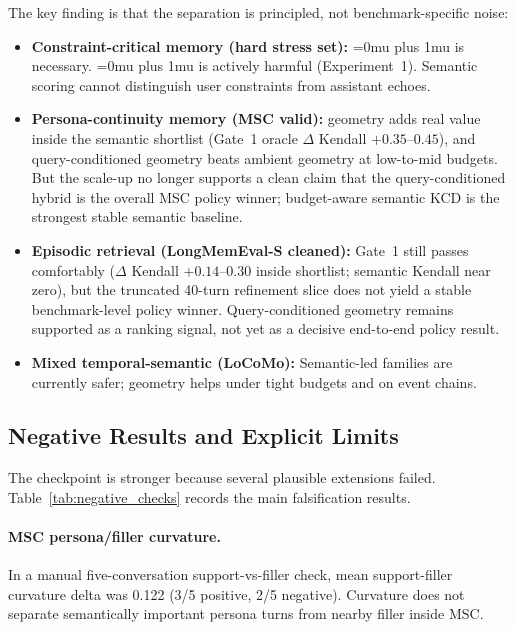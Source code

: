 \documentclass[conference]{IEEEtran}
\newcommand{\pname}[1]{\begingroup\Urlmuskip=0mu plus 1mu\relax\path{#1}\endgroup}
\begin{document}
The key finding is that the separation is principled, not benchmark-specific noise:
\begin{itemize}[leftmargin=1.4em]
    \item \textbf{Constraint-critical memory (hard stress set):} \pname{geometry_KCD} is necessary. \pname{semantic_KCD} is actively harmful (Experiment~1). Semantic scoring cannot distinguish user constraints from assistant echoes.
    \item \textbf{Persona-continuity memory (MSC valid):} geometry adds real value inside the semantic shortlist (Gate~1 oracle $\Delta$ Kendall $+0.35$--$0.45$), and query-conditioned geometry beats ambient geometry at low-to-mid budgets. But the scale-up no longer supports a clean claim that the query-conditioned hybrid is the overall MSC policy winner; budget-aware semantic KCD is the strongest stable semantic baseline.
    \item \textbf{Episodic retrieval (LongMemEval-S cleaned):} Gate~1 still passes comfortably ($\Delta$ Kendall $+0.14$--$0.30$ inside shortlist; semantic Kendall near zero), but the truncated 40-turn refinement slice does not yield a stable benchmark-level policy winner. Query-conditioned geometry remains supported as a ranking signal, not yet as a decisive end-to-end policy result.
    \item \textbf{Mixed temporal-semantic (LoCoMo):} Semantic-led families are currently safer; geometry helps under tight budgets and on event chains.
\end{itemize}

\subsection{Negative Results and Explicit Limits}
\label{sec:negative}
The checkpoint is stronger because several plausible extensions failed. Table~\ref{tab:negative_checks} records the main falsification results.

\begin{table}[t]
    \centering
    \caption{Negative-result checkpoints. These tests sharpen the claim boundary of the geometry program.}
    \label{tab:negative_checks}
    \resizebox{\columnwidth}{!}{}
\end{table}

\paragraph{MSC persona/filler curvature.} In a manual five-conversation support-vs-filler check, mean support-filler curvature delta was 0.122 (3/5 positive, 2/5 negative). Curvature does not separate semantically important persona turns from nearby filler inside MSC.
\end{document}
